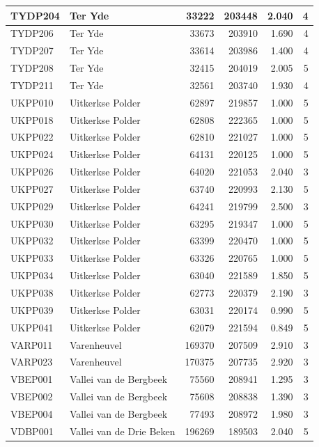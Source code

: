 \documentclass[11pt,]{book}
\begin{document}
\begin{table}
\begin{tabular}[t]{l|l|r|r|r|r}
\hline
TYDP204 & Ter Yde & 33222 & 203448 & 2.040 & 4\\
\hline
TYDP206 & Ter Yde & 33673 & 203910 & 1.690 & 4\\
\hline
TYDP207 & Ter Yde & 33614 & 203986 & 1.400 & 4\\
\hline
TYDP208 & Ter Yde & 32415 & 204019 & 2.005 & 5\\
\hline
TYDP211 & Ter Yde & 32561 & 203740 & 1.930 & 4\\
\hline
UKPP010 & Uitkerkse Polder & 62897 & 219857 & 1.000 & 5\\
\hline
UKPP018 & Uitkerkse Polder & 62808 & 222365 & 1.000 & 5\\
\hline
UKPP022 & Uitkerkse Polder & 62810 & 221027 & 1.000 & 5\\
\hline
UKPP024 & Uitkerkse Polder & 64131 & 220125 & 1.000 & 5\\
\hline
UKPP026 & Uitkerkse Polder & 64020 & 221053 & 2.040 & 3\\
\hline
UKPP027 & Uitkerkse Polder & 63740 & 220993 & 2.130 & 5\\
\hline
UKPP029 & Uitkerkse Polder & 64241 & 219799 & 2.500 & 3\\
\hline
UKPP030 & Uitkerkse Polder & 63295 & 219347 & 1.000 & 5\\
\hline
UKPP032 & Uitkerkse Polder & 63399 & 220470 & 1.000 & 5\\
\hline
UKPP033 & Uitkerkse Polder & 63326 & 220765 & 1.000 & 5\\
\hline
UKPP034 & Uitkerkse Polder & 63040 & 221589 & 1.850 & 5\\
\hline
UKPP038 & Uitkerkse Polder & 62773 & 220379 & 2.190 & 3\\
\hline
UKPP039 & Uitkerkse Polder & 63031 & 220174 & 0.990 & 5\\
\hline
UKPP041 & Uitkerkse Polder & 62079 & 221594 & 0.849 & 5\\
\hline
VARP011 & Varenheuvel & 169370 & 207509 & 2.910 & 3\\
\hline
VARP023 & Varenheuvel & 170375 & 207735 & 2.920 & 3\\
\hline
VBEP001 & Vallei van de Bergbeek & 75560 & 208941 & 1.295 & 3\\
\hline
VBEP002 & Vallei van de Bergbeek & 75608 & 208838 & 1.390 & 3\\
\hline
VBEP004 & Vallei van de Bergbeek & 77493 & 208972 & 1.980 & 3\\
\hline
VDBP001 & Vallei van de Drie Beken & 196269 & 189503 & 2.040 & 5\\
\hline

\end{tabular}
\end{table}
\end{document}
